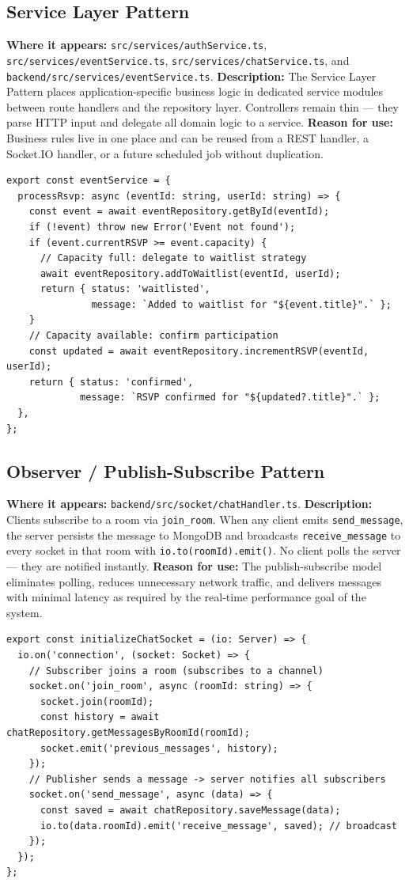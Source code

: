 \documentclass[12pt,a4paper]{article}
\begin{document}
\subsection{Service Layer Pattern}
\textbf{Where it appears:} \texttt{src/services/authService.ts}, \texttt{src/services/eventService.ts}, \texttt{src/services/chatService.ts}, and \texttt{backend/src/services/eventService.ts}.
\textbf{Description:} The Service Layer Pattern places application-specific business logic
in dedicated service modules between route handlers and the repository layer. Controllers
remain thin — they parse HTTP input and delegate all domain logic to a service.
\textbf{Reason for use:} Business rules live in one place and can be reused from a REST
handler, a Socket.IO handler, or a future scheduled job without duplication.
\begin{lstlisting}[caption={eventService.ts -- business logic isolated from the route handler}]
export const eventService = {
  processRsvp: async (eventId: string, userId: string) => {
    const event = await eventRepository.getById(eventId);
    if (!event) throw new Error('Event not found');
    if (event.currentRSVP >= event.capacity) {
      // Capacity full: delegate to waitlist strategy
      await eventRepository.addToWaitlist(eventId, userId);
      return { status: 'waitlisted',
               message: `Added to waitlist for "${event.title}".` };
    }
    // Capacity available: confirm participation
    const updated = await eventRepository.incrementRSVP(eventId, userId);
    return { status: 'confirmed',
             message: `RSVP confirmed for "${updated?.title}".` };
  },
};
\end{lstlisting}
\subsection{Observer / Publish-Subscribe Pattern}
\textbf{Where it appears:} \texttt{backend/src/socket/chatHandler.ts}.
\textbf{Description:} Clients subscribe to a room via \texttt{join\_room}. When any
client emits \texttt{send\_message}, the server persists the message to MongoDB and
broadcasts \texttt{receive\_message} to every socket in that room with
\texttt{io.to(roomId).emit()}. No client polls the server --- they are notified instantly.
\textbf{Reason for use:} The publish-subscribe model eliminates polling, reduces
unnecessary network traffic, and delivers messages with minimal latency as required
by the real-time performance goal of the system.
\begin{lstlisting}[caption={chatHandler.ts -- Observer pattern via Socket.IO room broadcast}]
export const initializeChatSocket = (io: Server) => {
  io.on('connection', (socket: Socket) => {
    // Subscriber joins a room (subscribes to a channel)
    socket.on('join_room', async (roomId: string) => {
      socket.join(roomId);
      const history = await chatRepository.getMessagesByRoomId(roomId);
      socket.emit('previous_messages', history);
    });
    // Publisher sends a message -> server notifies all subscribers
    socket.on('send_message', async (data) => {
      const saved = await chatRepository.saveMessage(data);
      io.to(data.roomId).emit('receive_message', saved); // broadcast
    });
  });
};
\end{lstlisting}
\end{document}
